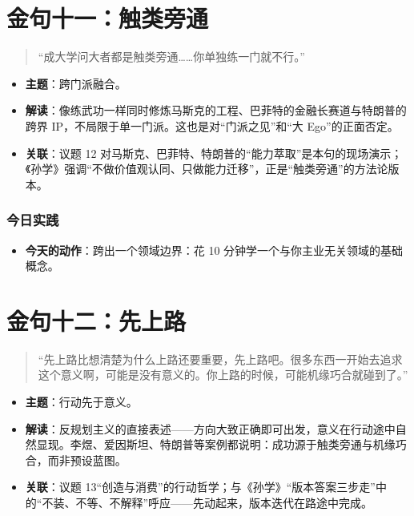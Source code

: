 \section{金句十一：触类旁通}

\begin{quote}
``成大学问大者都是触类旁通\ldots\ldots 你单独练一门就不行。''
\end{quote}

\begin{itemize}
\tightlist
\item
  \textbf{主题}：跨门派融合。
\item
  \textbf{解读}：像练武功一样同时修炼马斯克的工程、巴菲特的金融长赛道与特朗普的跨界
  IP，不局限于单一门派。这也是对``门派之见''和``大 Ego''的正面否定。
\item
  \textbf{关联}：议题 12
  对马斯克、巴菲特、特朗普的``能力萃取''是本句的现场演示；《孙学》强调``不做价值观认同、只做能力迁移''，正是``触类旁通''的方法论版本。
\end{itemize}

\subsubsection{今日实践}

\begin{itemize}
\tightlist
\item
  \textbf{今天的动作}：跨出一个领域边界：花 10
  分钟学一个与你主业无关领域的基础概念。
\end{itemize}

\section{金句十二：先上路}

\begin{quote}
``先上路比想清楚为什么上路还要重要，先上路吧。很多东西一开始去追求这个意义啊，可能是没有意义的。你上路的时候，可能机缘巧合就碰到了。''
\end{quote}

\begin{itemize}
\tightlist
\item
  \textbf{主题}：行动先于意义。
\item
  \textbf{解读}：反规划主义的直接表述------方向大致正确即可出发，意义在行动途中自然显现。李煜、爱因斯坦、特朗普等案例都说明：成功源于触类旁通与机缘巧合，而非预设蓝图。
\item
  \textbf{关联}：议题
  13``创造与消费''的行动哲学；与《孙学》``版本答案三步走''中的``不装、不等、不解释''呼应------先动起来，版本迭代在路途中完成。
\end{itemize}

